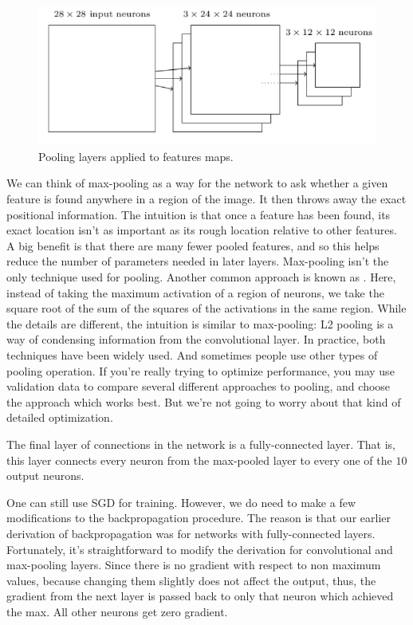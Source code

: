{\begin{figure}
\centering
\includegraphics[scale=0.5]{img/CNN7}
\caption{Pooling layers applied to features maps.}
\label{fig:CNN7}
\end{figure}
We can think of max-pooling as a way for the network to ask whether a given feature is found anywhere in a region of the image. It then throws away the exact positional information. The intuition is that once a feature has been found, its exact location isn't as important as its rough location relative to other features. A big benefit is that there are many fewer pooled features, and so this helps reduce the number of parameters needed in later layers. Max-pooling isn't the only technique used for pooling. Another common approach is known as . Here, instead of taking the maximum activation of a region of neurons, we take the square root of the sum of the squares of the activations in the same region. While the details are different, the intuition is similar to max-pooling: L2 pooling is a way of condensing information from the convolutional layer. In practice, both techniques have been widely used. And sometimes people use other types of pooling operation. If you're really trying to optimize performance, you may use validation data to compare several different approaches to pooling, and choose the approach which works best. But we're not going to worry about that kind of detailed optimization. 

The final layer of connections in the network is a fully-connected layer. That is, this layer connects every neuron from the max-pooled layer to every one of the $10$ output neurons.

One can still use SGD for training. However, we do need to make a few modifications to the backpropagation procedure. The reason is that our earlier derivation of backpropagation was for networks with fully-connected layers. Fortunately, it's straightforward to modify the derivation for convolutional and max-pooling layers. Since there is no gradient with respect to non maximum values, because changing them slightly does not affect the output, thus, the gradient from the next layer is passed back to only that neuron which achieved the max.  All other neurons get zero gradient.

}
